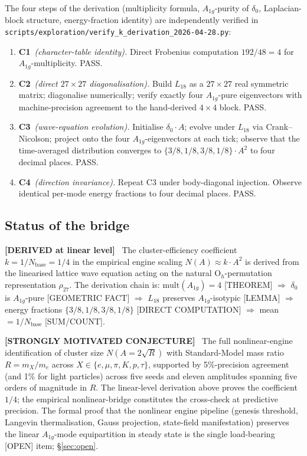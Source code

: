 \documentclass[11pt,reqno]{amsart}
\theoremstyle{plain}
\theoremstyle{definition}
\theoremstyle{remark}
\numberwithin{equation}{section}
\newcommand{\Ohgrp}{\mathrm{O}_h}
\newcommand{\Aoneg}{A_{1g}}
\newcommand{\Nbase}{N_{\mathrm{base}}}
\newenvironment{epistemic}[1]{\par\medskip\noindent\textbf{[#1]}\ }{\par\medskip}
\begin{document}
The four steps of the derivation (multiplicity formula, $\Aoneg$-purity
of $\delta_{0}$, Laplacian-block structure, energy-fraction identity)
are independently verified in
\texttt{scripts/exploration/verify\_k\_derivation\_2026-04-28.py}:

\begin{enumerate}
\item \textbf{C1}\ \emph{(character-table identity).} Direct
Frobenius computation $192/48 = 4$ for $\Aoneg$-multiplicity. PASS.
\item \textbf{C2}\ \emph{(direct $27\times 27$ diagonalisation).}
Build $L_{18}$ as a $27 \times 27$ real symmetric matrix; diagonalise
numerically; verify exactly four $\Aoneg$-pure eigenvectors with
machine-precision agreement to the hand-derived $4 \times 4$ block.
PASS.
\item \textbf{C3}\ \emph{(wave-equation evolution).} Initialise
$\delta_{0}\cdot A$; evolve under $L_{18}$ via Crank--Nicolson;
project onto the four $\Aoneg$-eigenvectors at each tick; observe
that the time-averaged distribution converges to
$\{3/8, 1/8, 3/8, 1/8\}\cdot A^{2}$ to four decimal places. PASS.
\item \textbf{C4}\ \emph{(direction invariance).} Repeat C3 under
body-diagonal injection. Observe identical per-mode energy
fractions to four decimal places. PASS.
\end{enumerate}

\subsection{Status of the bridge}

\begin{epistemic}{DERIVED at linear level}
The cluster-efficiency coefficient $k = 1/\Nbase = 1/4$ in the
empirical engine scaling $N(A) \approx k\cdot A^{2}$ is derived
from the linearised lattice wave equation acting on the natural
$\Ohgrp$-permutation representation $\rho_{27}$. The derivation
chain is: $\mathrm{mult}(\Aoneg) = 4$ [THEOREM] $\Rightarrow$
$\delta_{0}$ is $\Aoneg$-pure [GEOMETRIC FACT] $\Rightarrow$
$L_{18}$ preserves $\Aoneg$-isotypic [LEMMA] $\Rightarrow$ energy
fractions $\{3/8, 1/8, 3/8, 1/8\}$ [DIRECT COMPUTATION] $\Rightarrow$
mean $= 1/\Nbase$ [SUM/COUNT].
\end{epistemic}

\begin{epistemic}{STRONGLY MOTIVATED CONJECTURE}
The full nonlinear-engine identification of cluster size
$N(A = 2\sqrt{R})$ with Standard-Model mass ratio $R = m_{X}/m_{e}$
across $X \in \{e, \mu, \pi, K, p, \tau\}$, supported by
5\%-precision agreement (and 1\% for
light particles) across five seeds and eleven amplitudes spanning
five orders of magnitude in $R$. The linear-level derivation
above proves the coefficient $1/4$; the empirical
nonlinear-bridge constitutes the cross-check at predictive
precision. The formal proof that the nonlinear engine pipeline
(genesis threshold, Langevin thermalisation, Gauss projection,
state-field manifestation) preserves the linear $\Aoneg$-mode
equipartition in steady state is the single load-bearing [OPEN]
item; \S\ref{sec:open}.
\end{epistemic}
\end{document}
